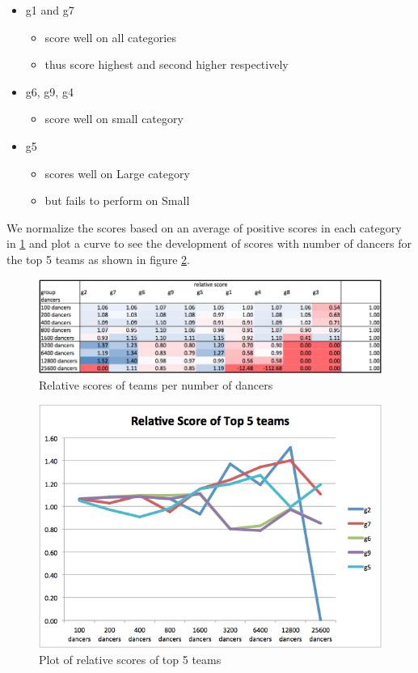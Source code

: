 \begin{itemize}
\tightlist
\item
  g1 and g7

  \begin{itemize}
  \tightlist
  \item
    score well on all categories
  \item
    thus score highest and second higher respectively
  \end{itemize}
\item
  g6, g9, g4

  \begin{itemize}
  \tightlist
  \item
    score well on small category
  \end{itemize}
\item
  g5

  \begin{itemize}
  \tightlist
  \item
    scores well on Large category
  \item
    but fails to perform on Small
  \end{itemize}
\end{itemize}

We normalize the scores based on an average of positive scores in each
category in \ref{team-rel} and plot a curve to see the development of
scores with number of dancers for the top 5 teams as shown in figure
\ref{team-5-rel}.

\begin{figure}[htbp]
\centering
\includegraphics[width=\textwidth]{imgs/team-rel.png}
\caption{Relative scores of teams per number of dancers\label{team-rel}}
\end{figure}

\begin{figure}[htbp]
\centering
\includegraphics[width=\textwidth]{imgs/team-5-rel.png}
\caption{Plot of relative scores of top 5 teams\label{team-5-rel}}
\end{figure}

